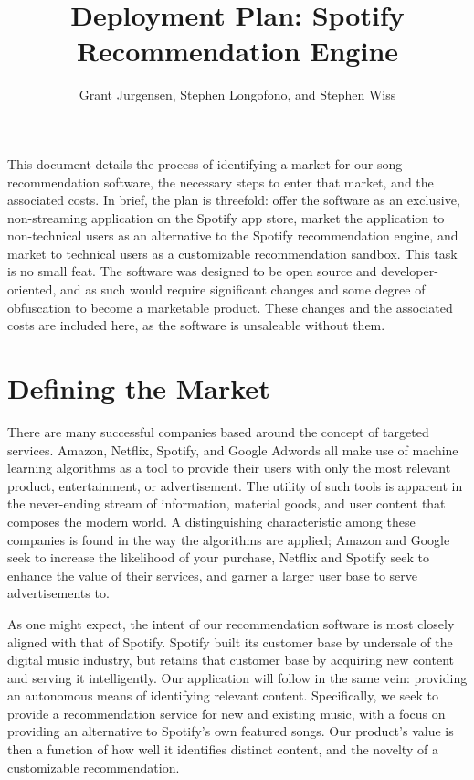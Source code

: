 \documentclass{roffin}
\begin{document}
\title{Deployment Plan: Spotify Recommendation Engine}

\author{Grant Jurgensen, Stephen Longofono, and Stephen Wiss}

\maketitle

This document details the process of identifying a market for our song recommendation software, the necessary steps to enter that market, and the associated costs.  In brief, the plan is threefold: offer the software as an exclusive, non-streaming application on the Spotify app store, market the application to non-technical users as an alternative to the Spotify recommendation engine, and market to technical users as a customizable recommendation sandbox.  This task is no small feat.  The software was designed to be open source and developer-oriented, and as such would require significant changes and some degree of obfuscation to become a marketable product.  These changes and the associated costs are included here, as the software is unsaleable without them.


\section{Defining the Market}
There are many successful companies based around the concept of targeted services.  Amazon, Netflix, Spotify, and Google Adwords all make use of machine learning algorithms as a tool to provide their users with only the most relevant product, entertainment, or advertisement.  The utility of such tools is apparent in the never-ending stream of information, material goods, and user content that composes the modern world.  A distinguishing characteristic among these companies is found in the way the algorithms are applied; Amazon and Google seek to increase the likelihood of your purchase, Netflix and Spotify seek to enhance the value of their services, and garner a larger user base to serve advertisements to.

As one might expect, the intent of our recommendation software is most closely aligned with that of Spotify.  Spotify built its customer base by undersale of the digital music industry, but retains that customer base by acquiring new content and serving it intelligently.  Our application will follow in the same vein: providing an autonomous means of identifying relevant content.  Specifically, we seek to provide a recommendation service for new and existing music, with a focus on providing an alternative to Spotify's own featured songs.  Our product's value is then a function of how well it identifies distinct content, and the novelty of a customizable recommendation.
\end{document}
